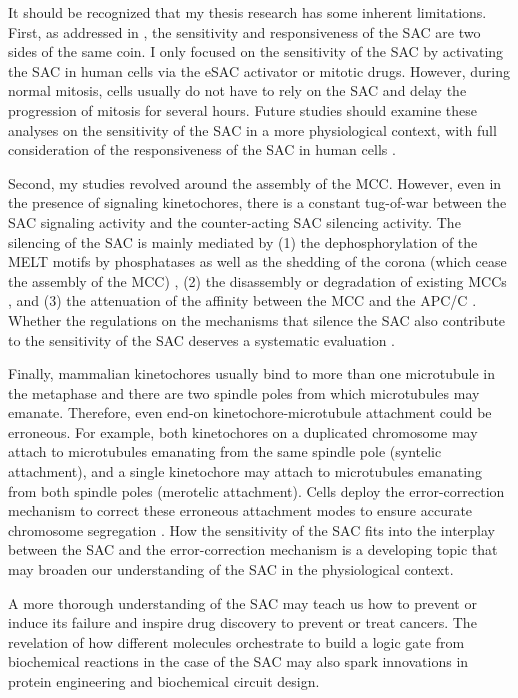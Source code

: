 It should be recognized that my thesis research has some inherent limitations. First, as addressed in , the sensitivity and responsiveness of the SAC are two sides of the same coin. I only focused on the sensitivity of the SAC by activating the SAC in human cells via the eSAC activator or mitotic drugs. However, during normal mitosis, cells usually do not have to rely on the SAC and delay the progression of mitosis for several hours. Future studies should examine these analyses on the sensitivity of the SAC in a more physiological context, with full consideration of the responsiveness of the SAC in human cells \cite{YeastMELTSpecificity}.

Second, my studies revolved around the assembly of the MCC. However, even in the presence of signaling kinetochores, there is a constant tug-of-war between the SAC signaling activity and the counter-acting SAC silencing activity. The silencing of the SAC is mainly mediated by (1) the dephosphorylation of the MELT motifs by phosphatases as well as the shedding of the corona (which cease the assembly of the MCC) \cite{PP2A-B56, DyneinStripsCorona}, (2) the disassembly or degradation of existing MCCs \cite{BubR1MitosisTurnover, CCT-MCCDisassembly, Ubiquitylation-MCCDisassembly, UBR5-MCCDisassembly, TRIP13-p31-MAD2}, and (3) the attenuation of the affinity between the MCC and the APC/C \cite{APC-SUMO}. Whether the regulations on the mechanisms that silence the SAC also contribute to the sensitivity of the SAC deserves a systematic evaluation \cite{0thOrder, ZeroOrder}.

Finally, mammalian kinetochores usually bind to more than one microtubule in the metaphase and there are two spindle poles from which microtubules may emanate. Therefore, even end-on kinetochore-microtubule attachment could be erroneous. For example, both kinetochores on a duplicated chromosome may attach to microtubules emanating from the same spindle pole (syntelic attachment), and a single kinetochore may attach to microtubules emanating from both spindle poles (merotelic attachment). Cells deploy the error-correction mechanism to correct these erroneous attachment modes to ensure accurate chromosome segregation \cite{Syntelic+Merotelic}. How the sensitivity of the SAC fits into the interplay between the SAC and the error-correction mechanism is a developing topic that may broaden our understanding of the SAC in the physiological context.



A more thorough understanding of the SAC may teach us how to prevent or induce its failure and inspire drug discovery to prevent or treat cancers. The revelation of how different molecules orchestrate to build a  logic gate from biochemical reactions in the case of the SAC may also spark innovations in protein engineering and biochemical circuit design.